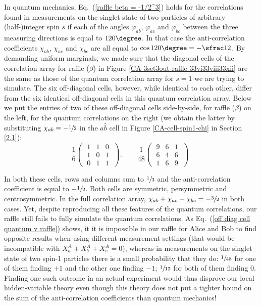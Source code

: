 In quantum mechanics, Eq.\ (\ref{raffle beta = -1/2^3}) holds for the correlations found in measurements on the singlet state of two particles of arbitrary (half-)integer spin $s$ if each of  the angles $\varphi_{ab}$, $\varphi_{ac}$ and $\varphi_{bc}$ between the three measuring directions is equal to $120\degree$. In that case the anti-correlation coefficients $\chi_{ab}$, $\chi_{ac}$ and $\chi_{bc}$ are all equal to $\cos 120\degree = -\sfrac12$. By demanding uniform marginals, we made sure that the diagonal cells of the correlation array for raffle ($\beta$) in Figure \ref{CA-3set3out-raffle-33vi33viii33xii} are the same as those of the quantum correlation array for $s=1$ we are trying to simulate. The six off-diagonal cells, however, while identical to each other, differ from the six identical off-diagonal cells in this quantum correlation array. Below we put the entries of two of these off-diagonal cells side-by-side, for raffle ($\beta$) on the left, for the quantum correlations on the right (we obtain the latter by substituting $\chi_{ab} = -\sfrac12$ in the $\hat{a} \hat{b}$ cell in Figure \ref{CA-cell-spin1-chi} in Section \ref{2.1}):  
\begin{equation}
\frac{1}{6}
\begin{pmatrix}
\; 1 & 1 & 0 \; \\[.2cm]
\; 1 & 0 & 1 \; \\[.2cm]
\; 0 & 1 & 1 \;
\end{pmatrix},
\quad\quad
\frac{1}{48}
\begin{pmatrix}
\; 9 & 6 &1 \; \\[.2cm]
\; 6 & 4 & 6 \;\\[.2cm]
\; 1 & 6 & 9 \; 
\end{pmatrix}.
\label{off diag cell quantum v raffle}
\end{equation}

In both these cells, rows and columns sum to $\sfrac13$ and the anti-correlation coefficient is equal to $-\sfrac12$. Both cells are symmetric, persymmetric and centrosymmetric. In the full correlation array, $\chi_{ab} + \chi_{ac} + \chi_{bc} = -\sfrac32$ in both cases. Yet, despite reproducing all these features of the quantum correlations, our raffle still fails to fully simulate the quantum correlations. As Eq.\ (\ref{off diag cell quantum v raffle}) shows, it it is impossible in our raffle for Alice and Bob to find opposite results when using different measurement settings (that would be incompatible with $X^A_a + X^A_b + X^A_c = 0$), whereas in measurements on the singlet state of two spin-1 particles there is a small probability that they do: $\sfrac{1}{48}$ for one of them finding $+1$ and the other one finding $-1$; $\sfrac{1}{12}$ for both of them finding $0$. Finding one such outcome in an actual experiment would thus disprove our local hidden-variable theory even though this theory does not put a tighter bound on the sum of the anti-correlation coefficients than quantum mechanics!

